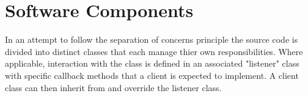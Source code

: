 \section{Software Components}

In an attempt to follow the separation of concerns principle the source code is divided into distinct classes that each manage thier own responsibilities. Where applicable, interaction with the class is defined in an associated "listener" class with specific callback methods that a client is expected to implement. A client class can then inherit from and override the listener class.

